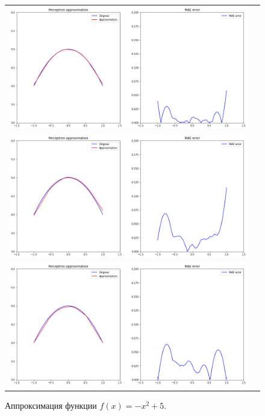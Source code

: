 \documentclass[12pt, a4paper]{article}
\begin{document}
    \begin{figure}[h]
        \center
        \begin{tabular}{cc}
            \includegraphics[width = 14cm]{f11_1_1.png} \\
            \includegraphics[width = 14cm]{f11_1_2.png} \\
            \includegraphics[width = 14cm]{f11_1_3.png} \\
        \end{tabular}
        \label{image1}
        \caption{Аппроксимация функции $f(x) = - x^2 + 5$.}
    \end{figure}
    
\end{document}
